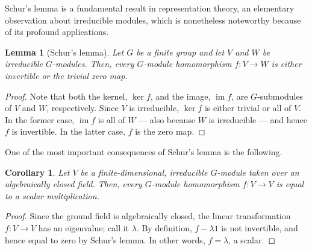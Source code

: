 \documentclass[12pt]{article}
\newtheorem*{lemma}{Lemma}
\newtheorem*{corollary}{Corollary}
\newcommand{\image}{\operatorname{im}}
\begin{document}

Schur's lemma is a fundamental result in representation theory,
an elementary observation about irreducible modules, which is nonetheless
noteworthy because of its profound applications.

\begin{lemma}[Schur's lemma]
  Let $G$ be a finite group and let $V$ and $W$ be irreducible
  $G$-modules. Then, every $G$-module homomorphism $f: V \to W$ is
  either invertible or the trivial zero map.
\end{lemma}
\begin{proof}
  Note that both the kernel, $\ker f$, and the image, $\image f$, are $G$-submodules of $V$ and
  $W$, respectively.  Since $V$ is irreducible, $\ker f$ is either
  trivial or all of $V$. In the former case, $\image f$ is all of $W$
  --- also because $W$ is irreducible --- and  hence $f$ is invertible. In
  the latter case, $f$ is the zero map.
\end{proof}

One of the most important consequences of Schur's lemma is the following.

\begin{corollary}
  Let $V$ be a finite-dimensional, irreducible $G$-module taken over
  an algebraically closed field. Then, every $G$-module homomorphism
  $f: V \to V$ is equal to a scalar multiplication.
\end{corollary}
\begin{proof}
  Since the ground field is algebraically closed, the linear
  transformation $f: V\to V$ has an eigenvalue; call it $\lambda$.
  By definition, $f - \lambda 1$ is not invertible, and hence equal to
  zero by Schur's lemma. In other words, $f = \lambda$, a scalar.
\end{proof}
\end{document}
